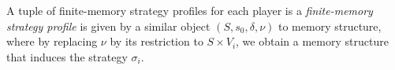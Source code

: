 A tuple of finite-memory strategy profiles for each player is a \emph{finite-memory strategy profile}  is given by a similar object $(S, s_0, \delta, \nu)$ to memory structure, where by replacing $\nu$ by its restriction to $S \times V_i$, we obtain a memory structure that induces the strategy $\sigma_i$.%






